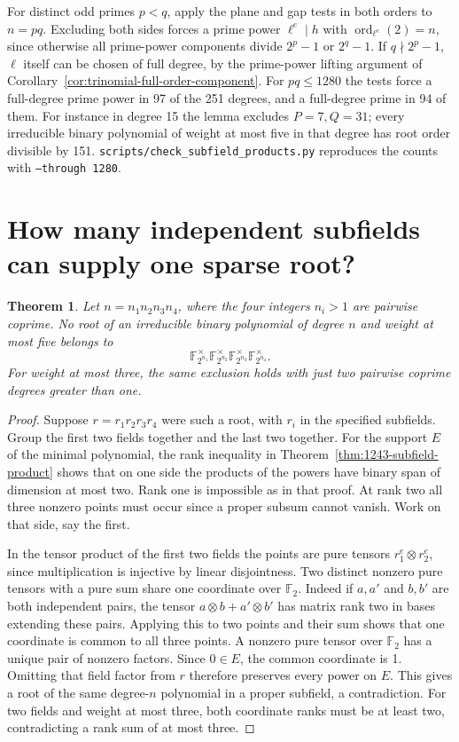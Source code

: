 \documentclass[11pt]{article}
\newtheorem{theorem}{Theorem}
\newcommand{\F}{\mathbb F_2}
\newcommand{\ord}{\operatorname{ord}}
\begin{document}
For distinct odd primes \(p<q\), apply the plane and gap tests in
both orders to \(n=pq\). Excluding both sides forces a prime power
\(\ell^e\mid h\) with \(\ord_{\ell^e}(2)=n\), since otherwise all
prime-power components divide \(2^p-1\) or \(2^q-1\).
If \(q\nmid2^p-1\), \(\ell\) itself can be chosen of full degree,
by the prime-power lifting argument of
Corollary~\ref{cor:trinomial-full-order-component}.
For \(pq\le1280\) the tests force a full-degree prime power in
97 of the 251 degrees, and a full-degree prime in 94 of them.
For instance in degree 15 the lemma excludes \(P=7,Q=31\);
every irreducible binary polynomial of weight at most five in that
degree has root order divisible by 151.
\nolinkurl{scripts/check_subfield_products.py} reproduces the counts
with \texttt{--through 1280}.

\section{How many independent subfields can supply one sparse root?}
\begin{theorem}\label{thm:four-subfields}
Let \(n=n_1n_2n_3n_4\), where the four integers \(n_i>1\) are pairwise
coprime. No root of an irreducible binary polynomial of degree \(n\)
and weight at most five belongs to
\[
 \mathbb F_{2^{n_1}}^\times\mathbb F_{2^{n_2}}^\times
 \mathbb F_{2^{n_3}}^\times\mathbb F_{2^{n_4}}^\times .
\]
For weight at most three, the same exclusion holds with just two
pairwise coprime degrees greater than one.
\end{theorem}
\begin{proof}
Suppose \(r=r_1r_2r_3r_4\) were such a root, with \(r_i\) in the
specified subfields. Group the first two fields together and the
last two together. For the support \(E\) of the minimal polynomial,
the rank inequality in Theorem~\ref{thm:1243-subfield-product}
shows that on one side the products of the powers have binary span
of dimension at most two. Rank one is impossible as in that proof.
At rank two all three nonzero points must occur since a proper
subsum cannot vanish. Work on that side, say the first.

In the tensor product of the first two fields the points are pure
tensors \(r_1^e\otimes r_2^e\), since multiplication is injective
by linear disjointness. Two distinct nonzero pure tensors with
a pure sum share one coordinate over \(\F\). Indeed if \(a,a'\)
and \(b,b'\) are both independent pairs, the tensor
\(a\otimes b+a'\otimes b'\) has matrix rank two in bases extending
these pairs. Applying this to two points and their sum shows that
one coordinate is common to all three points. A nonzero pure tensor
over \(\F\) has a unique pair of nonzero factors. Since \(0\in E\),
the common coordinate is 1. Omitting that field factor from \(r\)
therefore preserves every power on \(E\). This gives a root of the
same degree-\(n\) polynomial in a proper subfield, a contradiction.
For two fields and weight at most three, both coordinate ranks
must be at least two, contradicting a rank sum of at most three.
\end{proof}
\end{document}
